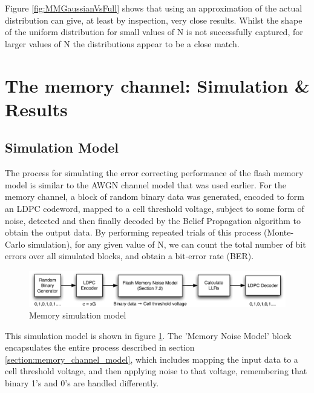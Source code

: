 \documentclass[11pt]{article}
\numberwithin{equation}{subsection}
\begin{document}
Figure \ref{fig:MMGaussianVsFull} shows that using an approximation of the actual distribution can give, at least by inspection, very close results. Whilst the shape of the uniform distribution for small values of N is not successfully captured, for larger values of N the distributions appear to be a close match. 

\section{The memory channel: Simulation \& Results}
\subsection{Simulation Model}
The process for simulating the error correcting performance of the flash memory model is similar to the AWGN channel model that was used earlier. For the memory channel, a block of random binary data was generated, encoded to form an LDPC codeword, mapped to a cell threshold voltage, subject to some form of noise, detected and then finally decoded by the Belief Propagation algorithm to obtain the output data. By performing repeated trials of this process (Monte-Carlo simulation), for any given value of N, we can count the total number of bit errors over all simulated blocks, and obtain a bit-error rate (BER). 

\begin{figure}[h]
\centering
\includegraphics[scale=0.85]{memory_channel_model}
\caption{Memory simulation model}
\label{fig:mem_simulation_model}
\end{figure}

This simulation model is shown in figure \ref{fig:mem_simulation_model}. The 'Memory Noise Model' block encapsulates the entire process described in section \ref{section:memory_channel_model}, which includes mapping the input data to a cell threshold voltage, and then applying noise to that voltage, remembering that binary 1's and 0's are handled differently.
\end{document}
